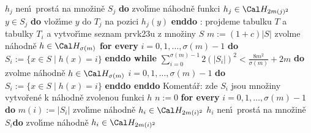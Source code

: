 \phantom{------------}{\bf while} $h_j$ nen\'\i\ prost\'a na mno\v zin\v e $
S_j$ {\bf do}\newline
\phantom{---------------}zvol\'\i me n\'ahodn\v e funkci $h_j\in \Cal H_{2m(j)^2}$\newline
\phantom{------------}{\bf enddo}\newline
\phantom{------------}{\bf for every} $y\in S_j$ {\bf do} vlo\v z\'\i me $
y$ do $T_j$ na pozici $h_j(y)$ {\bf enddo}\newline 
\phantom{---------}{\bf endif}\newline 
\phantom{------}{\bf endif}\newline 
\phantom{---}{\bf else}\newline 
\phantom{------}{\bf RehashAll}\newline
\phantom{---}{\bf endif\newline 
endif
\bigskip

\flushpar RehashAll}:\newline 
projdeme tabulku $T$ a tabulky $T_i$ a vytvo\v r\'\i me seznam 
prvk\accent23u z mno\v ziny $S$\newline 
$m:=(1+c)|S|$\newline 
zvolme n\'ahodn\v e $h\in \Cal H_{\sigma (m)}$ \newline 
{\bf for every} $i=0,1,\dots,\sigma (m)-1$ {\bf do} $S_i:=\{x\in S\mid h(x)=i\}$ {\bf enddo\newline
while} $\sum_{i=0}^{\sigma (m)-1}2(|S_i|)^2<\frac {8m^2}{\sigma (
m)}+2m$ {\bf do}\newline
\phantom{---}zvolme n\'ahodn\v e $h\in \Cal H_{\sigma (m)}$ \newline 
\phantom{---}{\bf for every} $i=0,1,\dots,\sigma (m)-1$ {\bf do} $S_i:=\{x\in S\mid h(x)=i\}$ {\bf enddo\newline
enddo}
Koment\'a\v r: zde $S_i$ jsou mno\v ziny vytvo\v ren\'e k n\'ahodn\v e zvolenou 
funkci $h$ \newline 
$n:=0$ \newline 
{\bf for every} $i=0,1,\dots,\sigma (m)-1$ {\bf do}\newline
\phantom{---}$m(i):=|S_i|$\newline 
\phantom{---}zvol\'\i me n\'ahodn\v e $h_i\in \Cal H_{2m(i)^2}$\newline 
\phantom{---}{\bf while} $h_i$ nen\'\i\ prost\'a na mno\v zin\v e $
S_i${\bf do}\newline
\phantom{------}zvol\'\i me n\'ahodn\v e $h_i\in \Cal H_{2m(i)^2}$\newline
